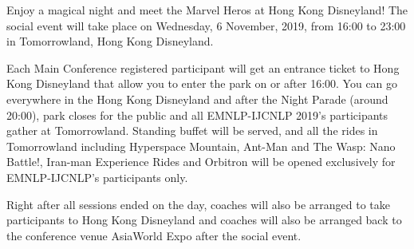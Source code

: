 \noindent 
Enjoy a magical night and meet the Marvel Heros at Hong Kong Disneyland!  The social event will take place on Wednesday, 6 November, 2019, from 16:00 to 23:00 in Tomorrowland, Hong Kong Disneyland.  

Each Main Conference registered participant will get an entrance ticket to Hong Kong Disneyland that allow you to enter the park on or after 16:00.  You can go everywhere in the Hong Kong Disneyland and after the Night  Parade (around 20:00), park closes for the public and all EMNLP-IJCNLP 2019’s participants gather at Tomorrowland.  Standing buffet will be served, and all the rides in Tomorrowland including Hyperspace Mountain, Ant-Man and The Wasp: Nano Battle!, Iran-man Experience Rides and Orbitron will be opened exclusively for EMNLP-IJCNLP’s participants only.

Right after all sessions ended on the day, coaches will also be arranged to take participants to Hong Kong Disneyland and coaches will also be arranged back to the conference venue AsiaWorld Expo after the social event.